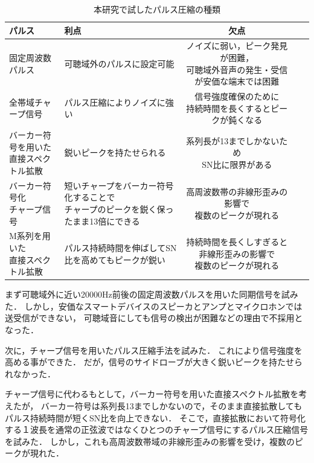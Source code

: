 \begin{table}[p]\centering
  \caption{本研究で試したパルス圧縮の種類}
  \label{tab:pulsecomps}
  \begin{tabular}{ll|ccc}
    \hline
    パルス & 利点 & 欠点 \\
    \hline
    \parbox{10zw}{固定周波数パルス}
      & \parbox{10zw}{可聴域外のパルスに設定可能}
      & \parbox{10zw}{ノイズに弱い，ピーク発見が困難， \\ 可聴域外音声の発生・受信が安価な端末では困難}
      \\
    \hline
    \parbox{10zw}{全帯域チャープ信号}
      & \parbox{10zw}{パルス圧縮によりノイズに強い}
      & \parbox{10zw}{信号強度確保のために \\ 持続時間を長くするとピークが鈍くなる}
      \\
    \hline
    \parbox{10zw}{バーカー符号を用いた \\ 直接スペクトル拡散}
      & \parbox{10zw}{鋭いピークを持たせられる}
      & \parbox{10zw}{系列長が13までしかないため \\ SN比に限界がある}
      \\
    \hline
    \parbox{10zw}{バーカー符号化\\ チャープ信号}
      & \parbox{10zw}{短いチャープをバーカー符号化することで \\ チャープのピークを鋭く保ったまま13倍にできる}
      & \parbox{10zw}{高周波数帯の非線形歪みの影響で \\ 複数のピークが現れる}
      \\
    \hline
    \parbox{10zw}{M系列を用いた\\ 直接スペクトル拡散}
      & \parbox{10zw}{パルス持続時間を伸ばしてSN比を高めてもピークが鋭い}
      & \parbox{10zw}{持続時間を長くしすぎると非線形歪みの影響で \\ 複数のピークが現れる}
      \\
    \hline
  \end{tabular}
\end{table}

まず可聴域外に近い20000Hz前後の固定周波数パルスを用いた同期信号を試みた．
しかし，安価なスマートデバイスのスピーカとアンプとマイクロホンでは送受信ができない，
可聴域音にしても信号の検出が困難などの理由で不採用となった．

次に，チャープ信号を用いたパルス圧縮手法を試みた．
これにより信号強度を高める事ができた．
だが，信号のサイドローブが大きく鋭いピークを持たせられなかった．

チャープ信号に代わるもとして，バーカー符号を用いた直接スペクトル拡散を考えたが，
バーカー符号は系列長13までしかないので，そのまま直接拡散してもパルス持続時間が短くSN比を向上できない．
そこで，直接拡散において符号化する１波長を通常の正弦波ではなくひとつのチャープ信号にするパルス圧縮信号を試みた．
しかし，これも高周波数帯域の非線形歪みの影響を受け，複数のピークが現れた．


